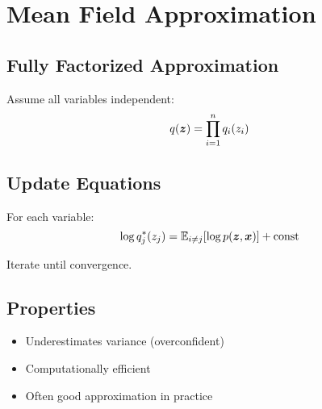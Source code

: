 
\section{Mean Field Approximation }
\label{sec:mean-field}

\subsection{Fully Factorized Approximation}

Assume all variables independent:
\begin{equation}
q(\boldsymbol{z}) = \prod_{i=1}^{n} q_i(z_i)
\end{equation}

\subsection{Update Equations}

For each variable:
\begin{equation}
\log q_j^*(z_j) = \mathbb{E}_{i \neq j}[\log p(\boldsymbol{z}, \boldsymbol{x})] + \text{const}
\end{equation}

Iterate until convergence.

\subsection{Properties}

\begin{itemize}
    \item Underestimates variance (overconfident)
    \item Computationally efficient
    \item Often good approximation in practice
\end{itemize}





